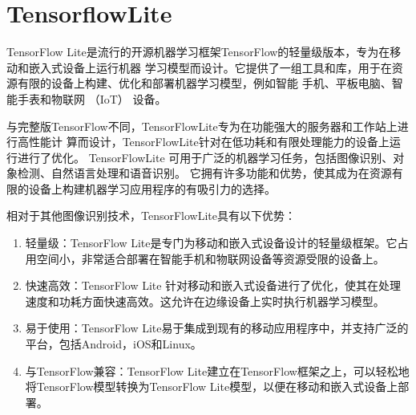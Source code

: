 %
%
%
%

\section{Tensorflow\hspace{0.5em}Lite}
TensorFlow Lite是流行的开源机器学习框架TensorFlow的轻量级版本，专为在移动和嵌入式设备上运行机器
学习模型而设计。它提供了一组工具和库，用于在资源有限的设备上构建、优化和部署机器学习模型，例如智能
手机、平板电脑、智能手表和物联网 （IoT） 设备。

与完整版TensorFlow不同，TensorFlow\hspace{0.5em}Lite专为在功能强大的服务器和工作站上进行高性能计
算而设计，TensorFlow\hspace{0.5em}Lite针对在低功耗和有限处理能力的设备上运行进行了优化。
TensorFlow\hspace{0.5em}Lite 可用于广泛的机器学习任务，包括图像识别、对象检测、自然语言处理和语音识别。
它拥有许多功能和优势，使其成为在资源有限的设备上构建机器学习应用程序的有吸引力的选择。

相对于其他图像识别技术，TensorFlow\hspace{0.5em}Lite具有以下优势：
\begin{enumerate}
    \item 轻量级：TensorFlow Lite是专门为移动和嵌入式设备设计的轻量级框架。它占用空间小，非常适合部署在智能手机和物联网设备等资源受限的设备上。
    \item 快速高效：TensorFlow Lite 针对移动和嵌入式设备进行了优化，使其在处理速度和功耗方面快速高效。这允许在边缘设备上实时执行机器学习模型。
    \item 易于使用：TensorFlow Lite易于集成到现有的移动应用程序中，并支持广泛的平台，包括Android，iOS和Linux。
    \item 与TensorFlow兼容：TensorFlow Lite建立在TensorFlow框架之上，可以轻松地将TensorFlow模型转换为TensorFlow Lite模型，以便在移动和嵌入式设备上部署。
\end{enumerate}


